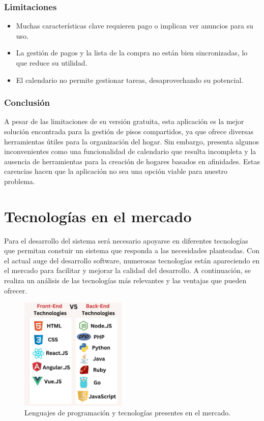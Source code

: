 \subsubsection*{Limitaciones}
\begin{itemize}
    \item Muchas características clave requieren pago o implican ver anuncios para su uso.
    \item La gestión de pagos y la lista de la compra no están bien sincronizadas, lo que reduce su utilidad.
    \item El calendario no permite gestionar tareas, desaprovechando su potencial.
\end{itemize}
\subsubsection*{Conclusión}
A pesar de las limitaciones de su versión gratuita, esta aplicación es la mejor solución encontrada para la gestión de pisos compartidos, ya que ofrece diversas herramientas útiles para la organización del hogar. Sin embargo, presenta algunos inconvenientes como una funcionalidad de calendario que resulta incompleta y la ausencia de herramientas para la creación de hogares basados en afinidades. Estas carencias hacen que la aplicación no sea una opción viable para nuestro problema.

\section{Tecnologías en el mercado}
Para el desarrollo del sistema será necesario apoyarse en diferentes tecnologías que permitan constuir un sistema que responda a las necesidades planteadas.
Con el actual auge del desarrollo software, numerosas tecnologías están apareciendo en el mercado para facilitar y mejorar la calidad del desarrollo. A continuación, se realiza un análisis de las tecnologías más relevantes y las ventajas que pueden ofrecer.

\begin{figure}[H]
    \centering
    \includegraphics[width=0.45\textwidth]{fotos/lenguajes.jpg}
    \caption{Lenguajes de programación y tecnologías presentes en el mercado\textbf{}.}
    \label{fig:lenguajes-programacion}
\end{figure}
